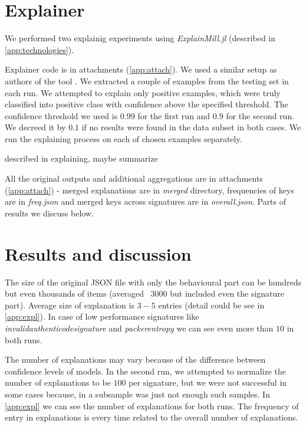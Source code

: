 \section{Explainer}
We performed two explainig experiments using \emph{ExplainMill.jl} (described in \ref{app:technologies}). 

Explainer code is in attachments (\ref{app:attach}). We used a similar setup as authors of the tool \cite{Pevny2020}. We extracted a couple of examples from the testing set in each run. We attempted to explain only positive examples, which were truly classified into positive class with confidence above the specified threshold. The confidence threshold we used is $0.99$ for the first run and $0.9$ for the second run. We decreed it by $0.1$ if no results were found in the data subset in both cases. We run the explaining process on each of chosen examples separately.

described in explaining, maybe summarize

All the original outputs and additional aggregations are in attachments (\ref{app:attach}) - merged explanations are in \emph{merged} directory, frequencies of keys are in \emph{freq.json} and merged keys across signatures are in \emph{overall.json}. Parts of results we discuss below.


\section{Results and discussion}
The size of the original JSON file with only the behavioural part can be hundreds but even thousands of items (averaged \texttildelow~$3000$ but included even the signature part). Average size of explanation is $3-5$ entries (detail could be see in \ref{app:expl}). In case of low performance signatures like \emph{invalidauthenticodesignature} and \emph{packerentropy} we can see even more than $10$ in both runs.

The number of explanations may vary because of the difference between confidence levels of models. In the second run, we attempted to normalize the number of explanations to be $100$ per signature, but we were not successful in some cases because, in a subsample was just not enough such samples.  In \ref{app:expl} we can see the number of explanations for both runs. The frequency of entry in explanations is every time related to the overall number of explanations.

